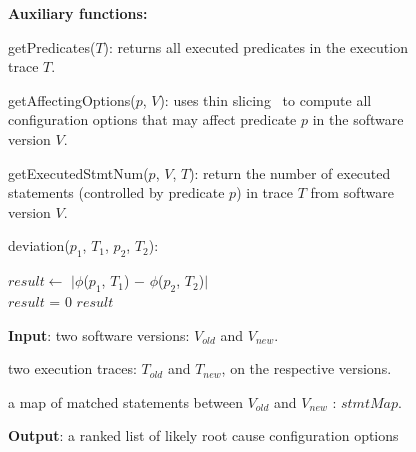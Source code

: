 
\begin{figure}[t]
\textbf{Auxiliary functions:}

getPredicates($\mathit{T}$): returns all executed predicates in the execution trace $\mathit{T}$.

getAffectingOptions($\mathit{p}$, $\mathit{V}$): uses thin slicing~\cite{Sridharan:2007} to compute all configuration options that may affect predicate $\mathit{p}$ in the software version $\mathit{V}$. 

getExecutedStmtNum($\mathit{p}$, $\mathit{V}$, $\mathit{T}$): return the number of executed statements (controlled by predicate $\mathit{p}$) in trace $\mathit{T}$ from software version $\mathit{V}$.



deviation($\mathit{p_{1}}$, $\mathit{T_1}$, $\mathit{p_{2}}$, $\mathit{T_2}$):\\
\vspace{-4mm}%
\begin{algorithmic}[1]
\STATE $\mathit{result} \leftarrow$ $|$$\phi$($\mathit{p_{1}}$, $\mathit{T_1}$) $-$ $\phi$($\mathit{p_{2}}$, $\mathit{T_2}$)$|$\\
\STATE $\mathit{result}$ = 0
\ENDIF
\RETURN $\mathit{result}$
\end{algorithmic}

\textbf{Input}: two software versions: $\mathit{V_{old}}$ and $\mathit{V_{new}}$. 

\quad two execution traces: $\mathit{T_{old}}$ and $\mathit{T_{new}}$, on the respective versions.

\quad a map of matched statements between $\mathit{V_{old}}$ and $\mathit{V_{new}}$ : $\mathit{stmtMap}$.

\textbf{Output}: {a ranked list of likely root cause configuration options}

\vspace{1mm}


\end{figure}
